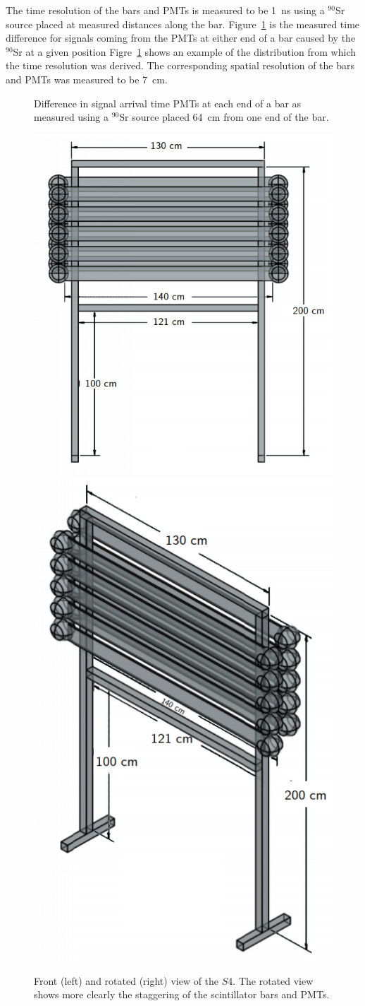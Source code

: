 The time resolution of the bars and PMTs is measured to be 1~ns using a $^{90}$Sr source placed at measured distances along the bar.
Figure~\ref{fig:s4Res} is the measured time difference for signals coming from the PMTs at either end of a bar caused by the $^{90}$Sr at a given position
Figre~\ref{fig:s4Res} shows an example of the distribution from which the time resolution was derived.
The corresponding spatial resolution of the bars and PMTs was measured to be 7~cm.

\begin{figure}[ht]
  \begin{adjustbox}{max totalsize={.6\textwidth}{.5\textheight},center}
    
  \end{adjustbox}
  \caption{Difference in signal arrival time PMTs at each end of a bar as measured using a $^{90}$Sr source placed 64~cm from one end of the bar.}
  \label{fig:s4Res}	
\end{figure}

\begin{figure}[ht]    
  \centering
  \includegraphics[width=0.5\linewidth]{files/Figures/dstofFront2.png}
  \hfill
  \includegraphics[width=0.35\linewidth]{files/Figures/dstofDiag2.png}
  \caption{Front (left) and rotated (right) view of the $\mathit{S4}$. The rotated view shows more clearly the staggering of the scintillator bars and PMTs.}
  \label{fig:dstofDiagram}
\end{figure}

